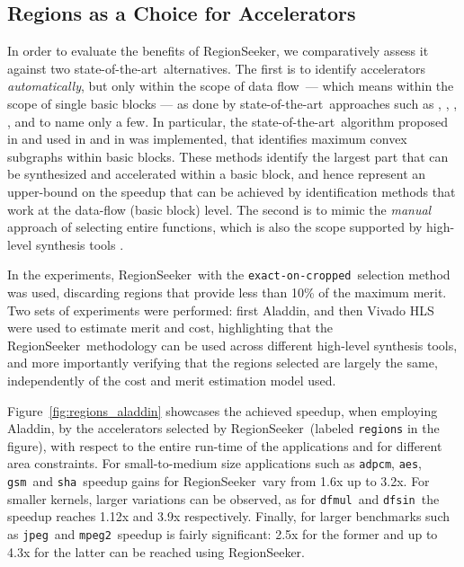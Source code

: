 \documentclass[]{usiinfthesis}
\newcommand{\rseeker}{{RegionSeeker}}
\newcommand{\SoTA}{{state-of-the-art}}
\newcommand{\dataflow}{data flow}
\newcommand{\exactC}{\texttt{exact-on-cropped}}
\newcommand{\adpcm}{\texttt{adpcm}}
\newcommand{\sha}{\texttt{sha}}
\newcommand{\jpeg}{\texttt{jpeg}}
\newcommand{\mpeg}{\texttt{mpeg2}}
\newcommand{\aes}{\texttt{aes}}
\newcommand{\dfmul}{\texttt{dfmul}}
\newcommand{\dfsin}{\texttt{dfsin}}
\newcommand{\gsm}{\texttt{gsm}}
\begin{document}
\subsection{Regions as a Choice for Accelerators}
\label{subsec:res_llvm}

In order to evaluate the benefits of \rseeker, we comparatively assess
it against two \SoTA\ alternatives.  The first is to
identify accelerators \emph{automatically}, but only within the scope
of \dataflow\ --- which means within the scope of single basic blocks
--- as done by \SoTA\ approaches such as \cite{YuSep04},
\cite{PozziJul06}, \cite{ChenFeb07}, \cite{ReddingtonAug09}, and
\cite{GiaquintaMar15} to name only a few. In particular, the \SoTA\ algorithm 
proposed in \cite{VermaOct07} and used in \cite{PothineniJan07} and in
\cite{GiaquintaMar15} was implemented, that identifies maximum convex subgraphs within
basic blocks. These methods identify the largest part that can be
synthesized and accelerated within a basic block, and hence represent
an upper-bound on the speedup that can be achieved by identification
methods that work at the data-flow (basic block) level. The second is
to mimic the \emph{manual} approach of selecting entire functions,
which is also the scope supported by high-level synthesis tools
\cite{CanisSep13} \cite{VillarrealMay10} \cite{VivadoHLSMar17}.\par

In the experiments, \rseeker\ with the \exactC\ selection method was
used, discarding regions that provide less than 10\% of the maximum
merit. Two sets of experiments were performed: first Aladdin, and then
Vivado HLS were used to estimate merit and cost, highlighting that
the \rseeker\ methodology can be used
across different high-level synthesis tools, and more importantly
verifying that the regions selected are largely the same,
independently of the cost and merit estimation model used.\par

Figure~\ref{fig:regions_aladdin} showcases the achieved
speedup, when employing Aladdin, by the accelerators selected by
\rseeker\ (labeled \texttt{regions} in the figure), with respect to
the entire run-time of the applications and for different area
constraints.  For small-to-medium size applications such as \adpcm,
\aes, \gsm\ and \sha\ speedup gains for \rseeker\ vary from 1.6x up to
3.2x. For smaller kernels, larger variations can be observed, as for
\dfmul\ and \dfsin\ the speedup reaches 1.12x and 3.9x respectively.
Finally, for larger benchmarks such as \jpeg\ and \mpeg\, speedup is
fairly significant: 2.5x for the former and up to 4.3x for the latter
can be reached using \rseeker.\par
\end{document}
